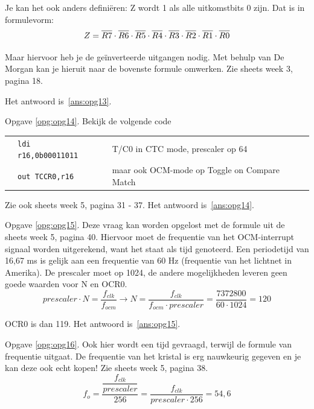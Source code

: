 \documentclass[a4paper,12pt,fleqn,dutch]{tisdexam}
\newcommand*{\oline}[1]{\overline{#1\mathstrut}}
\begin{document}
\begin{questions}
Je kan het ook anders defini\"{e}ren: Z wordt 1 als alle uitkomstbits 0 zijn.
Dat is in formulevorm:
\begin{equation}
\nonumber Z = \oline{R7}\cdot\oline{R6}\cdot\oline{R5}\cdot\oline{R4}\cdot
                        \oline{R3}\cdot\oline{R2}\cdot\oline{R1}\cdot\oline{R0}
\end{equation}

Maar hiervoor heb je de ge\"{i}nverteerde uitgangen nodig. Met behulp van De
Morgan kan je hieruit naar de bovenste formule omwerken. Zie sheets week 3,
pagina 18.

Het antwoord is~\ref{ans:opg13}.

\vspace{1em}
Opgave \ref{opg:opg14}. Bekijk de volgende code

\begin{table}[h!]
	\begin{tabular}{l l l l}
		 & \texttt{ldi r16,0b00011011}   &  &  T/C0 in CTC mode, prescaler op 64  \\ 
	 	 & \texttt{out TCCR0,r16}        &  &  maar ook OCM-mode op Toggle on Compare Match  \\ 
	\end{tabular} 
\end{table}

Zie ook sheets week 5, pagina 31 - 37. Het antwoord is~\ref{ans:opg14}.

\vspace{1em}
Opgave \ref{opg:opg15}. Deze vraag kan worden opgelost met de formule uit de sheets
week 5, pagina 40. Hiervoor moet de frequentie van het OCM-interrupt signaal
worden uitgerekend, want het staat als tijd genoteerd. Een periodetijd van
16,67 ms is gelijk aan een frequentie van 60 Hz (frequentie van het lichtnet
in Amerika). De prescaler moet op 1024, de andere mogelijkheden leveren geen
goede waarden voor N en OCR0.
\begin{equation}
\nonumber prescaler \cdot N = \dfrac{f_{clk}}{f_{ocm}} 
                    \longrightarrow N = \dfrac{f_{clk}}{f_{ocm} \cdot prescaler}
			= \dfrac{7372800}{60 \cdot 1024} = 120
\end{equation} 

OCR0 is dan 119. Het antwoord is~\ref{ans:opg15}.

\vspace{1em}
Opgave \ref{opg:opg16}. Ook hier wordt een tijd gevraagd, terwijl de formule van
frequentie uitgaat. De frequentie van het kristal is erg nauwkeurig gegeven
en je kan deze ook echt kopen! Zie sheets week 5, pagina 38.
\begin{equation}
\nonumber f_{o} = \dfrac{\dfrac{f_{clk}}{prescaler}}{256} = 
                  \dfrac{f_{clk}}{prescaler \cdot 256} = 54,6
\end{equation}


\end{questions}
\end{document}
